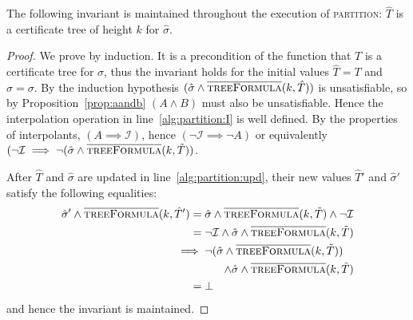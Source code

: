 \begin{proposition}
    The following invariant is maintained throughout the execution of \textsc{partition}: $\hat{T}$ is a certificate tree of height $k$ for $\hat{\sigma}$.
\end{proposition}
\begin{proof}
    We prove by induction. It is a precondition of the function that $T$ is a certificate tree for $\sigma$, thus the invariant holds for the initial values $\hat{T} = T$ and $\hat{\sigma} = \sigma$.  By the induction hypothesis $(\hat{\sigma} \land \textsc{$\overline{\mbox{treeFormula}}$}(k, \hat{T}))$ is unsatisfiable, so by Proposition~\ref{prop:aandb} $(A \land B)$ must also be unsatisfiable.  Hence the interpolation operation in line~\ref{alg:partition:I} is well defined.  By the properties of interpolants, $(A \implies \mathcal{I})$, hence $(\neg \mathcal{I} \implies \neg A)$ or equivalently $(\neg\mathcal{I} \implies \neg (\hat{\sigma} \land \textsc{$\overline{\mbox{treeFormula}}$}(k, \tilde{T}))$.

    After $\hat{T}$ and $\hat{\sigma}$ are updated in line~\ref{alg:partition:upd}, their new values $\hat{T}'$ and $\hat{\sigma}'$ satisfy the following equalities: \begin{align*}
        \hat{\sigma}' \land \opptf(k, \hat{T}') ={}& \hat{\sigma} \land \opptf(k, \tilde{T}) \land \neg\mathcal{I} \\
        ={}& \neg\mathcal{I} \land \hat{\sigma} \land \opptf(k, \tilde{T}) \\
        \implies{}& \neg (\hat{\sigma} \land \opptf(k, \tilde{T})) \\
                  & \pushright{\land \hat{\sigma} \land \opptf(k, \tilde{T})} \\
        ={}& \bot
\end{align*} and hence the invariant is maintained.
\end{proof}

